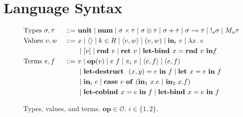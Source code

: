 \section{Language Syntax}

\begin{figure}[tbp]
  \begin{alignat*}{3}
         &\text{Types } \sigma, \tau &::=~ &\mathbf{unit}
         \mid \num
         \mid \sigma \times \tau 
         \mid \sigma \otimes \tau
         \mid \sigma + \tau 
         \mid \sigma \multimap \tau
         \mid {\bang{s} \sigma}
         \mid {M_u \tau}
         \\
         &\text{Values } v, w \ &::=~ &x
         \mid \langle \rangle
         \mid k \in R
         \mid \langle v,w \rangle 
         \mid (v, w)
         \mid \tin_i \ v
         \mid \lambda x.~e \\
         & & & \mid [v]
         \mid\rnd v
         \mid {\ret v} 
         \mid \letbind x = \rnd v \ \tin f 
         \\
         &\text{Terms } e, f &::=~ & v
         \mid \mathbf{op}(v)
         \mid e~f
         \mid {\pi}_i\ e
         \mid \langle e,f \rangle 
         \mid (e, f) \\
         & & & \mid \letdestruct \ (x,y) = e \ \tin \ f
         \mid \letassign x  = e \ \tin \ f \\
         & & & \mid \tin_i \ e
         \mid 
          \mathbf{case} \ v \ \mathbf{of} \ (\tin_1 \ x.e \ | \ \tin_2 \ x.f) \\
         & & & 
         \mid \letcobind x = e \ \tin \ f
         \mid {\letbind x = e \ \tin \ f}
  \end{alignat*}
  \caption{
    Types, values, and terms. 
    $\mathbf{op} \in \mathcal{O}$.
    $i \in \{1, 2\}$. 
  }
  \label{fig:syntax}
\end{figure}


